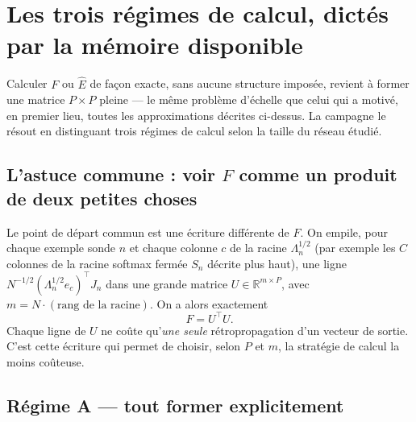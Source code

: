 \documentclass[11pt,a4paper]{article}
\begin{document}
\section{Les trois régimes de calcul, dictés par la mémoire disponible}
\label{sec:regimes}

Calculer $F$ ou $\hat E$ de façon exacte, sans aucune structure imposée, revient à former une
matrice $P\times P$ pleine — le même problème d'échelle que celui qui a motivé, en premier lieu,
toutes les approximations décrites ci-dessus. La campagne le résout en distinguant trois régimes de
calcul selon la taille du réseau étudié.

\subsection{L'astuce commune : voir $F$ comme un produit de deux petites choses}

Le point de départ commun est une écriture différente de $F$. On empile, pour chaque exemple sonde
$n$ et chaque colonne $c$ de la racine $\Lambda_n^{1/2}$ (par exemple les $C$ colonnes de la racine
softmax fermée $S_n$ décrite plus haut), une ligne $N^{-1/2}(\Lambda_n^{1/2}e_c)^\top J_n$ dans une
grande matrice $U\in\mathbb R^{m\times P}$, avec $m=N\cdot(\text{rang de la racine})$. On a alors
exactement
\[
F = U^\top U.
\]
Chaque ligne de $U$ ne coûte qu'\emph{une seule} rétropropagation d'un vecteur de sortie. C'est cette
écriture qui permet de choisir, selon $P$ et $m$, la stratégie de calcul la moins coûteuse.

\subsection{Régime A — tout former explicitement}
\end{document}

